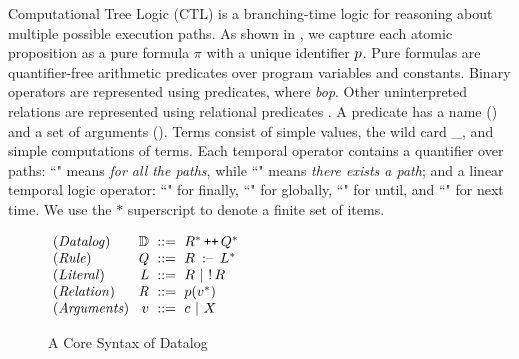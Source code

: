 Computational Tree Logic (CTL) is a branching-time logic for reasoning about multiple possible execution paths. As shown in , we capture each atomic proposition as a pure formula $\pi$ with a unique identifier $p$. 
Pure formulas are quantifier-free arithmetic predicates over program variables and constants. 
Binary operators are represented using predicates, where \emph{bop}\code{\,{\in}\,\s{>, <, \geq, \leq, =}}. 
Other uninterpreted relations are represented using relational predicates \code{\relation}. 
A predicate has a name (\code{\nm}) and a set of arguments (). 
Terms consist of simple values, 
the wild card \_, 
and simple computations of terms. 
Each temporal operator contains a quantifier over paths: 
``" means \emph{for all the paths}, while ``" means \emph{there exists a path}; and a linear temporal logic \cite{DBLP:conf/focs/Pnueli77} operator: ``" for finally, 
``" for globally, ``" for until, and 
``" for next time. 
We use the $*$ superscript to denote a finite set of items. 




\begin{figure}[!h]
{
\centering
\renewcommand{\arraystretch}{1}
$
\arraycolsep=3pt
\begin{array}{lrll}
\m{(Datalog)} &   \Datalog & 
{::=}& \relation^*  \concat    \drule^* 
\\
\m{(Rule)}&     \m{\drule} &{::=}&  
\relation ~\datalogarrow~ L^*
\\
\m{(Literal)} &    \m{L} &{::=}& 
\relation
{~\mid~}  %
\shortNeg\,\relation 
\\
\m{(Relation)} & \m{\relation} &{::=}& p(v^*) 
\\
\m{(Arguments)}&  v &{::=}& 
c  {~\mid~} X
\end{array}$
\caption{A Core Syntax of Datalog}
\label{fig:Syntax_of_Datalog}
}
\end{figure}


